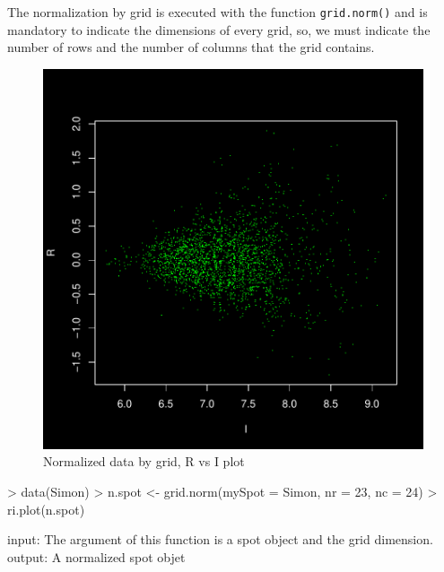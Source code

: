 \documentclass[12pt]{article}
\begin{document}
The normalization by grid is executed with the function \texttt{grid.norm()} and is mandatory to indicate the dimensions of every grid, so, we must indicate the number of rows and the number of columns that the grid contains.
\begin{figure}[h]
\begin{center}
\includegraphics{example-genArise-010}
\caption{Normalized data by grid, R vs I plot \label{fig8}}	
\end{center}
\end{figure}
\begin{Scode}
> data(Simon)
> n.spot <- grid.norm(mySpot = Simon, nr = 23, nc = 24)
> ri.plot(n.spot)
\end{Scode}

\begin{Soutput}
input: The argument of this function is a spot object
       and the grid dimension.
output: A normalized spot objet
\end{Soutput}
\end{document}
